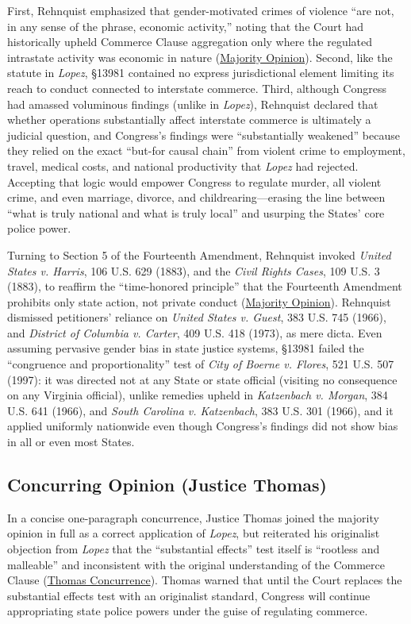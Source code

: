\documentclass[12pt]{article}
\begin{document}
First, Rehnquist emphasized that gender-motivated crimes of violence ``are not, in any sense of the phrase, economic activity,'' noting that the Court had historically upheld Commerce Clause aggregation only where the regulated intrastate activity was economic in nature (\href{https://www.law.cornell.edu/supct/html/99-5.ZO.html}{Majority Opinion}). Second, like the statute in \textit{Lopez}, \S 13981 contained no express jurisdictional element limiting its reach to conduct connected to interstate commerce. Third, although Congress had amassed voluminous findings (unlike in \textit{Lopez}), Rehnquist declared that whether operations substantially affect interstate commerce is ultimately a judicial question, and Congress's findings were ``substantially weakened'' because they relied on the exact ``but-for causal chain'' from violent crime to employment, travel, medical costs, and national productivity that \textit{Lopez} had rejected. Accepting that logic would empower Congress to regulate murder, all violent crime, and even marriage, divorce, and childrearing---erasing the line between ``what is truly national and what is truly local'' and usurping the States' core police power.

Turning to Section 5 of the Fourteenth Amendment, Rehnquist invoked \textit{United States v. Harris}, 106 U.S. 629 (1883), and the \textit{Civil Rights Cases}, 109 U.S. 3 (1883), to reaffirm the ``time-honored principle'' that the Fourteenth Amendment prohibits only state action, not private conduct (\href{https://www.law.cornell.edu/supct/html/99-5.ZO.html}{Majority Opinion}). Rehnquist dismissed petitioners' reliance on \textit{United States v. Guest}, 383 U.S. 745 (1966), and \textit{District of Columbia v. Carter}, 409 U.S. 418 (1973), as mere dicta. Even assuming pervasive gender bias in state justice systems, \S 13981 failed the ``congruence and proportionality'' test of \textit{City of Boerne v. Flores}, 521 U.S. 507 (1997): it was directed not at any State or state official (visiting no consequence on any Virginia official), unlike remedies upheld in \textit{Katzenbach v. Morgan}, 384 U.S. 641 (1966), and \textit{South Carolina v. Katzenbach}, 383 U.S. 301 (1966), and it applied uniformly nationwide even though Congress's findings did not show bias in all or even most States.

\subsection{Concurring Opinion (Justice Thomas)}
In a concise one-paragraph concurrence, Justice Thomas joined the majority opinion in full as a correct application of \textit{Lopez}, but reiterated his originalist objection from \textit{Lopez} that the ``substantial effects'' test itself is ``rootless and malleable'' and inconsistent with the original understanding of the Commerce Clause (\href{https://www.law.cornell.edu/supct/html/99-5.ZC.html}{Thomas Concurrence}). Thomas warned that until the Court replaces the substantial effects test with an originalist standard, Congress will continue appropriating state police powers under the guise of regulating commerce.
\end{document}
